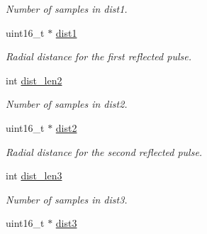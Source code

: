 \begin{DoxyCompactItemize}
\begin{DoxyCompactList}\small\item\em Number of samples in dist1. \end{DoxyCompactList}\item 
\hypertarget{structpacpus_1_1__scanData_ac62363d94dd8b528ea0c035ff8a430b9}{uint16\-\_\-t $\ast$ \hyperlink{structpacpus_1_1__scanData_ac62363d94dd8b528ea0c035ff8a430b9}{dist1}}\label{structpacpus_1_1__scanData_ac62363d94dd8b528ea0c035ff8a430b9}

\begin{DoxyCompactList}\small\item\em Radial distance for the first reflected pulse. \end{DoxyCompactList}\item 
\hypertarget{structpacpus_1_1__scanData_ac7b84a6c1ce46d838ced885b3ead71e2}{int \hyperlink{structpacpus_1_1__scanData_ac7b84a6c1ce46d838ced885b3ead71e2}{dist\-\_\-len2}}\label{structpacpus_1_1__scanData_ac7b84a6c1ce46d838ced885b3ead71e2}

\begin{DoxyCompactList}\small\item\em Number of samples in dist2. \end{DoxyCompactList}\item 
\hypertarget{structpacpus_1_1__scanData_a1002c1b81e099ab874d77576310404ad}{uint16\-\_\-t $\ast$ \hyperlink{structpacpus_1_1__scanData_a1002c1b81e099ab874d77576310404ad}{dist2}}\label{structpacpus_1_1__scanData_a1002c1b81e099ab874d77576310404ad}

\begin{DoxyCompactList}\small\item\em Radial distance for the second reflected pulse. \end{DoxyCompactList}\item 
\hypertarget{structpacpus_1_1__scanData_a7b7609549fadad0c4b3e14dccf60f094}{int \hyperlink{structpacpus_1_1__scanData_a7b7609549fadad0c4b3e14dccf60f094}{dist\-\_\-len3}}\label{structpacpus_1_1__scanData_a7b7609549fadad0c4b3e14dccf60f094}

\begin{DoxyCompactList}\small\item\em Number of samples in dist3. \end{DoxyCompactList}\item 
\hypertarget{structpacpus_1_1__scanData_a97b844317f160706c4aa8e62a57196fb}{uint16\-\_\-t $\ast$ \hyperlink{structpacpus_1_1__scanData_a97b844317f160706c4aa8e62a57196fb}{dist3}}\label{structpacpus_1_1__scanData_a97b844317f160706c4aa8e62a57196fb}


\end{DoxyCompactItemize}
